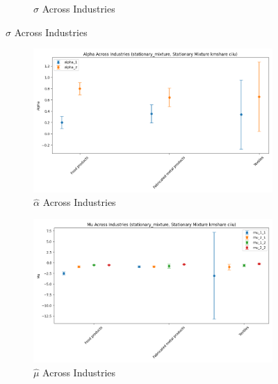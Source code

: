 \documentclass{article}
\begin{document}
\begin{figure}[ht!]
\begin{subfigure}[t]{0.32\textwidth}
        \caption{$\hat\sigma$ Across Industries}
    \end{subfigure}
\end{figure}

\begin{figure}[ht!]
    \centering 
    \caption{Stationary Mixture Model with $\log K$, Import and CIIU Across Industries}
    \begin{subfigure}[t]{0.32\textwidth}
        \centering
        \includegraphics[width=\textwidth]{figure/stationary_mixture_kmshare_ciiu_alpha_across_industries.png}
        \caption{$\hat\alpha$ Across Industries}
    \end{subfigure}
    \begin{subfigure}[t]{0.32\textwidth}
        \centering
        \includegraphics[width=\textwidth]{figure/stationary_mixture_kmshare_ciiu_mu_across_industries.png}
        \caption{$\hat\mu$ Across Industries}
    \end{subfigure}
    \begin{subfigure}[t]{0.32\textwidth}

\end{subfigure}
\end{figure}
\end{document}
